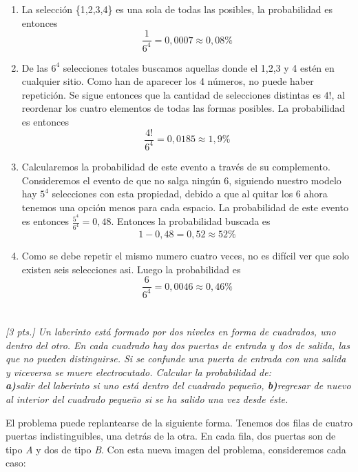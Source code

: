 \documentclass[11pt]{article}
\renewcommand{\(}{\left(}
\renewcommand{\)}{\right)}
\begin{document}
\begin{enumerate}
	\item La selección \{1,2,3,4\} es una sola de todas las posibles, la probabilidad es entonces $$\frac{1}{6^4} = 0,0007 \approx 0,08\%$$
	\item De las $6^4$ selecciones totales buscamos aquellas donde el 1,2,3 y 4 estén en cualquier sitio. Como han de aparecer los 4 números, no puede haber repetición. Se sigue entonces que la cantidad de selecciones distintas es $4!$, al reordenar los cuatro elementos de todas las formas posibles. La probabilidad es entonces $$\frac{4!}{6^4} = 0,0185 \approx 1,9\% $$
	\item Calcularemos la probabilidad de este evento a través de su complemento. Consideremos el evento de que no salga ningún 6, siguiendo nuestro modelo hay $5^4$ selecciones con esta propiedad, debido a que al quitar los 6 ahora tenemos una opción menos para cada espacio. La probabilidad de este evento es entonces $\frac{5^4}{6^4} = 0,48$. Entonces la probabilidad buscada es $$1 - 0,48 = 0,52 \approx 52\% $$
	\item Como se debe repetir el mismo numero cuatro veces, no es difícil ver que solo existen seis selecciones asi. Luego la probabilidad es $$\frac{6}{6^4} = 0,0046 \approx 0,46\% $$
\end{enumerate}

\section{}

\textit{[3 pts.] Un laberinto está formado por dos niveles en forma de cuadrados, uno dentro del otro. En cada cuadrado hay dos puertas de entrada y dos de salida, las que no pueden distinguirse. Si se confunde una puerta de entrada con una salida y viceversa se muere electrocutado. Calcular la probabilidad de: \\ \textbf{a)}salir del laberinto si uno está dentro del cuadrado pequeño, \textbf{b)}regresar de nuevo al interior del cuadrado pequeño si se ha salido una vez desde éste.}

El problema puede replantearse de la siguiente forma. Tenemos dos filas de cuatro puertas indistinguibles, una detrás de la otra. En cada fila, dos puertas son de tipo \textit{A} y dos de tipo \textit{B}. Con esta nueva imagen del problema, consideremos cada caso:
\end{document}
